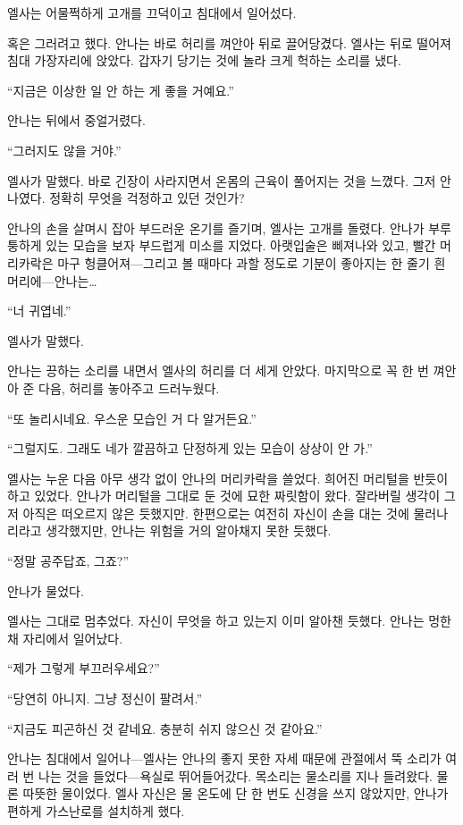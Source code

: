 엘사는 어물쩍하게 고개를 끄덕이고 침대에서 일어섰다.

혹은 그러려고 했다. 안나는 바로 허리를 껴안아 뒤로 끌어당겼다. 엘사는 뒤로 떨어져 침대 가장자리에 앉았다. 갑자기 당기는 것에 놀라 크게 헉하는 소리를 냈다.

``지금은 이상한 일 안 하는 게 좋을 거예요.''

안나는 뒤에서 중얼거렸다.

``그러지도 않을 거야.''

엘사가 말했다. 바로 긴장이 사라지면서 온몸의 근육이 풀어지는 것을 느꼈다. 그저 안나였다. 정확히 무엇을 걱정하고 있던 것인가?

안나의 손을 살며시 잡아 부드러운 온기를 즐기며, 엘사는 고개를 돌렸다. 안나가 부루퉁하게 있는 모습을 보자 부드럽게 미소를 지었다. 아랫입술은 삐져나와 있고, 빨간 머리카락은 마구 헝클어져—그리고 볼 때마다 과할 정도로 기분이 좋아지는 한 줄기 흰 머리에—안나는\ldots

``너 귀엽네.''

엘사가 말했다.

안나는 끙하는 소리를 내면서 엘사의 허리를 더 세게 안았다. 마지막으로 꼭 한 번 껴안아 준 다음, 허리를 놓아주고 드러누웠다.

``또 놀리시네요. 우스운 모습인 거 다 알거든요.''

``그럴지도. 그래도 네가 깔끔하고 단정하게 있는 모습이 상상이 안 가.''

엘사는 누운 다음 아무 생각 없이 안나의 머리카락을 쓸었다. 희어진 머리털을 반듯이 하고 있었다. 안나가 머리털을 그대로 둔 것에 묘한 짜릿함이 왔다. 잘라버릴 생각이 그저 아직은 떠오르지 않은 듯했지만. 한편으로는 여전히 자신이 손을 대는 것에 물러나리라고 생각했지만, 안나는 위험을 거의 알아채지 못한 듯했다.

``정말 공주답죠, 그죠?''

안나가 물었다.

엘사는 그대로 멈추었다. 자신이 무엇을 하고 있는지 이미 알아챈 듯했다. 안나는 멍한 채 자리에서 일어났다.

``제가 그렇게 부끄러우세요?''

``당연히 아니지. 그냥 정신이 팔려서.''

``지금도 피곤하신 것 같네요. 충분히 쉬지 않으신 것 같아요.''

안나는 침대에서 일어나—엘사는 안나의 좋지 못한 자세 때문에 관절에서 뚝 소리가 여러 번 나는 것을 들었다—욕실로 뛰어들어갔다. 목소리는 물소리를 지나 들려왔다. 물론 따뜻한 물이었다. 엘사 자신은 물 온도에 단 한 번도 신경을 쓰지 않았지만, 안나가 편하게 가스난로를 설치하게 했다.


